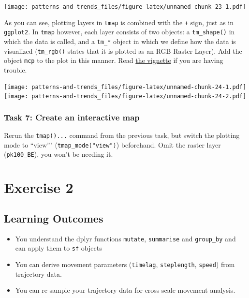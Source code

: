 \documentclass[
]{book}
\providecommand{\tightlist}{%
  \setlength{\itemsep}{0pt}\setlength{\parskip}{0pt}}
\begin{document}
\texttt{[image: patterns-and-trends\_files/figure-latex/unnamed-chunk-23-1.pdf]}

As you can see, plotting layers in \texttt{tmap} is combined with the \texttt{+} sign, just as in \texttt{ggplot2}. In \texttt{tmap} however, each layer consists of two objects: a \texttt{tm\_shape()} in which the data is called, and a \texttt{tm\_*} object in which we define how the data is visualized (\texttt{tm\_rgb()} states that it is plotted as an RGB Raster Layer). Add the object \texttt{mcp} to the plot in this manner. Read \href{https://cran.r-project.org/web/packages/tmap/vignettes/tmap-getstarted.html}{the vignette} if you are having trouble.

\texttt{[image: patterns-and-trends\_files/figure-latex/unnamed-chunk-24-1.pdf]} \texttt{[image: patterns-and-trends\_files/figure-latex/unnamed-chunk-24-2.pdf]}

\hypertarget{task-7-create-an-interactive-map}{%
\subsection{Task 7: Create an interactive map}\label{task-7-create-an-interactive-map}}

Rerun the \texttt{tmap()...} command from the previous task, but switch the plotting mode to ``view''" (\texttt{tmap\_mode("view")}) beforehand. Omit the raster layer (\texttt{pk100\_BE}), you won't be needing it.

\hypertarget{exercise-2}{%
\chapter{Exercise 2}\label{exercise-2}}

\hypertarget{learning-outcomes-1}{%
\section{Learning Outcomes}\label{learning-outcomes-1}}

\begin{itemize}
\tightlist
\item
  You understand the dplyr functions \texttt{mutate}, \texttt{summarise} and \texttt{group\_by} and can apply them to \texttt{sf} objects
\item
  You can derive movement parameters (\texttt{timelag}, \texttt{steplength}, \texttt{speed}) from trajectory data.
\item
  You can re-sample your trajectory data for cross-scale movement analysis.
\end{itemize}
\end{document}
